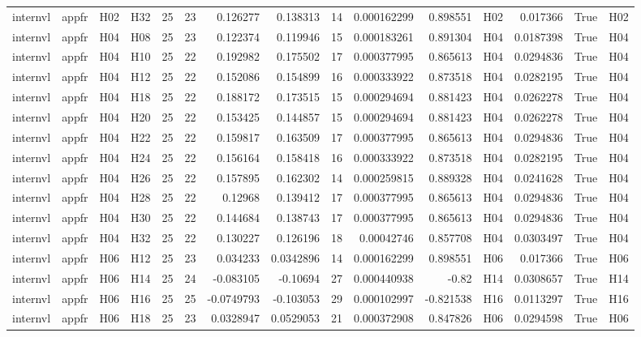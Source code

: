 \begin{longtable}{llllrrrrrrrlrrl}
internvl & appfr & H02 & H32 & 25 & 23 & 0.126277 & 0.138313 & 14 & 0.000162299 & 0.898551 & H02 & 0.017366 & True & H02 \\
internvl & appfr & H04 & H08 & 25 & 23 & 0.122374 & 0.119946 & 15 & 0.000183261 & 0.891304 & H04 & 0.0187398 & True & H04 \\
internvl & appfr & H04 & H10 & 25 & 22 & 0.192982 & 0.175502 & 17 & 0.000377995 & 0.865613 & H04 & 0.0294836 & True & H04 \\
internvl & appfr & H04 & H12 & 25 & 22 & 0.152086 & 0.154899 & 16 & 0.000333922 & 0.873518 & H04 & 0.0282195 & True & H04 \\
internvl & appfr & H04 & H18 & 25 & 22 & 0.188172 & 0.173515 & 15 & 0.000294694 & 0.881423 & H04 & 0.0262278 & True & H04 \\
internvl & appfr & H04 & H20 & 25 & 22 & 0.153425 & 0.144857 & 15 & 0.000294694 & 0.881423 & H04 & 0.0262278 & True & H04 \\
internvl & appfr & H04 & H22 & 25 & 22 & 0.159817 & 0.163509 & 17 & 0.000377995 & 0.865613 & H04 & 0.0294836 & True & H04 \\
internvl & appfr & H04 & H24 & 25 & 22 & 0.156164 & 0.158418 & 16 & 0.000333922 & 0.873518 & H04 & 0.0282195 & True & H04 \\
internvl & appfr & H04 & H26 & 25 & 22 & 0.157895 & 0.162302 & 14 & 0.000259815 & 0.889328 & H04 & 0.0241628 & True & H04 \\
internvl & appfr & H04 & H28 & 25 & 22 & 0.12968 & 0.139412 & 17 & 0.000377995 & 0.865613 & H04 & 0.0294836 & True & H04 \\
internvl & appfr & H04 & H30 & 25 & 22 & 0.144684 & 0.138743 & 17 & 0.000377995 & 0.865613 & H04 & 0.0294836 & True & H04 \\
internvl & appfr & H04 & H32 & 25 & 22 & 0.130227 & 0.126196 & 18 & 0.00042746 & 0.857708 & H04 & 0.0303497 & True & H04 \\
internvl & appfr & H06 & H12 & 25 & 23 & 0.034233 & 0.0342896 & 14 & 0.000162299 & 0.898551 & H06 & 0.017366 & True & H06 \\
internvl & appfr & H06 & H14 & 25 & 24 & -0.083105 & -0.10694 & 27 & 0.000440938 & -0.82 & H14 & 0.0308657 & True & H14 \\
internvl & appfr & H06 & H16 & 25 & 25 & -0.0749793 & -0.103053 & 29 & 0.000102997 & -0.821538 & H16 & 0.0113297 & True & H16 \\
internvl & appfr & H06 & H18 & 25 & 23 & 0.0328947 & 0.0529053 & 21 & 0.000372908 & 0.847826 & H06 & 0.0294598 & True & H06 \\

\end{longtable}
